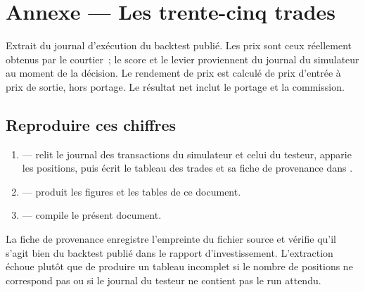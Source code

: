 \clearpage
\section*{Annexe --- Les trente-cinq trades}

Extrait du journal d'exécution du backtest publié. Les prix sont ceux
réellement obtenus par le courtier~; le score et le levier proviennent du
journal du simulateur au moment de la décision. Le rendement de prix est
calculé de prix d'entrée à prix de sortie, hors portage. Le résultat net inclut
le portage et la commission.

\medskip

{\footnotesize

}

\bigskip

\subsection*{Reproduire ces chiffres}

\begin{enumerate}[leftmargin=1.4em, itemsep=0.3em]
\item {} --- relit le
      journal des transactions du simulateur et celui du testeur, apparie les
      positions, puis écrit le tableau des trades et sa fiche de provenance
      dans .
\item {} --- produit les
      figures et les tables de ce document.
\item {} --- compile le
      présent document.
\end{enumerate}

La fiche de provenance 
enregistre l'empreinte du fichier source et vérifie qu'il s'agit bien du
backtest publié dans le rapport d'investissement. L'extraction échoue plutôt
que de produire un tableau incomplet si le nombre de positions ne correspond
pas ou si le journal du testeur ne contient pas le run attendu.
